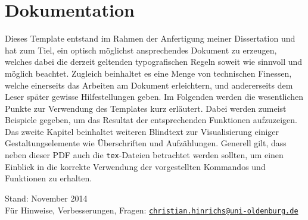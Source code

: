 %
\ifx\fulldocument\undefined
  
  \pagestyle{scrheadings}                                                       %
\fi
%
%
%
\chapter{Dokumentation}\label{sec:dokumentation}
%
Dieses Template entstand im Rahmen der Anfertigung meiner Dissertation \cite{Hinrichs2014} und hat zum Tiel, ein optisch möglichst ansprechendes Dokument zu erzeugen, welches dabei die derzeit geltenden typografischen Regeln soweit wie sinnvoll und möglich beachtet. Zugleich beinhaltet es eine Menge von technischen Finessen, welche einerseits das Arbeiten am Dokument erleichtern, und andererseits dem Leser später gewisse Hilfestellungen geben. Im Folgenden werden die wesentlichen Punkte zur Verwendung des Templates kurz erläutert. Dabei werden zumeist Beispiele gegeben, um das Resultat der entsprechenden Funktionen aufzuzeigen. Das zweite Kapitel beinhaltet weiteren Blindtext zur Visualisierung einiger Gestaltungselemente wie Überschriften und Aufzählungen. Generell gilt, dass neben dieser PDF auch die \texttt{tex}-Dateien betrachtet werden sollten, um einen Einblick in die korrekte Verwendung der vorgestellten Kommandos und Funktionen zu erhalten.
%
\\\par\noindent Stand: November 2014\\
Für Hinweise, Verbesserungen, Fragen: \href{mailto:christian.hinrichs@uni-oldenburg.de}{\nolinkurl{christian.hinrichs@uni-oldenburg.de}}
%
